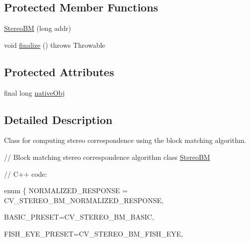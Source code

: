 \subsection*{Protected Member Functions}
\begin{DoxyCompactItemize}
\item 
\mbox{\hyperlink{classorg_1_1opencv_1_1calib3d_1_1_stereo_b_m_a50bd97cac119f57c04226fee83eec15d}{Stereo\+BM}} (long addr)
\item 
void \mbox{\hyperlink{classorg_1_1opencv_1_1calib3d_1_1_stereo_b_m_a1ea8aa0a5ea447ec32b4fffcf783b239}{finalize}} ()  throws Throwable 
\end{DoxyCompactItemize}
\subsection*{Protected Attributes}
\begin{DoxyCompactItemize}
\item 
final long \mbox{\hyperlink{classorg_1_1opencv_1_1calib3d_1_1_stereo_b_m_a1498072235c0ce625b0eeef22c817a34}{native\+Obj}}
\end{DoxyCompactItemize}


\subsection{Detailed Description}
Class for computing stereo correspondence using the block matching algorithm.

// Block matching stereo correspondence algorithm class \mbox{\hyperlink{classorg_1_1opencv_1_1calib3d_1_1_stereo_b_m}{Stereo\+BM}} {\ttfamily }

{\ttfamily }

{\ttfamily }

{\ttfamily // C++ code\+:}

{\ttfamily }

{\ttfamily }

{\ttfamily enum \{ N\+O\+R\+M\+A\+L\+I\+Z\+E\+D\+\_\+\+R\+E\+S\+P\+O\+N\+SE = C\+V\+\_\+\+S\+T\+E\+R\+E\+O\+\_\+\+B\+M\+\_\+\+N\+O\+R\+M\+A\+L\+I\+Z\+E\+D\+\_\+\+R\+E\+S\+P\+O\+N\+SE,}

{\ttfamily }

{\ttfamily }

{\ttfamily B\+A\+S\+I\+C\+\_\+\+P\+R\+E\+S\+ET=C\+V\+\_\+\+S\+T\+E\+R\+E\+O\+\_\+\+B\+M\+\_\+\+B\+A\+S\+IC,}

{\ttfamily }

{\ttfamily }

{\ttfamily F\+I\+S\+H\+\_\+\+E\+Y\+E\+\_\+\+P\+R\+E\+S\+ET=C\+V\+\_\+\+S\+T\+E\+R\+E\+O\+\_\+\+B\+M\+\_\+\+F\+I\+S\+H\+\_\+\+E\+YE,}

